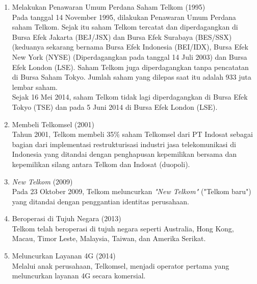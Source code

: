 \begin{enumerate}
	\item Melakukan Penawaran Umum Perdana Saham Telkom (1995)\\
	\tab Pada tanggal 14 November 1995, dilakukan Penawaran Umum Perdana saham Telkom. Sejak itu saham Telkom tercatat dan diperdagangkan di Bursa Efek Jakarta (BEJ/JSX) dan Bursa Efek Surabaya (BES/SSX) (keduanya sekarang bernama Bursa Efek Indonesia (BEI/IDX), Bursa Efek New York (NYSE) (Diperdagangkan pada tanggal 14 Juli 2003) dan Bursa Efek London (LSE). Saham Telkom juga diperdagangkan tanpa pencatatan di Bursa Saham Tokyo. Jumlah saham yang dilepas saat itu adalah 933 juta lembar saham.\\
	\tab Sejak 16 Mei 2014, saham Telkom tidak lagi diperdagangkan di Bursa Efek Tokyo (TSE) dan pada 5 Juni 2014 di Bursa Efek London (LSE).\\
	\item Membeli Telkomsel (2001)\\
	\tab Tahun 2001, Telkom membeli 35\% saham Telkomsel dari PT Indosat sebagai bagian dari implementasi restrukturisasi industri jasa telekomunikasi di Indonesia yang ditandai dengan penghapusan kepemilikan bersama dan kepemilikan silang antara Telkom dan Indosat (duopoli).\\
	\item \textit{New Telkom} (2009)\\
	\tab Pada 23 Oktober 2009, Telkom meluncurkan \textit{"New Telkom"} ("Telkom baru") yang ditandai dengan penggantian identitas perusahaan.\\
	\item Beroperasi di Tujuh Negara (2013)\\
	\tab Telkom telah beroperasi di tujuh negara seperti Australia, Hong Kong, Macau, Timor Leste, Malaysia, Taiwan, dan Amerika Serikat.\\
	\item Meluncurkan Layanan 4G (2014)\\
	\tab Melalui anak perusahaan, Telkomsel, menjadi operator pertama yang meluncurkan layanan 4G secara komersial.
\end{enumerate}

